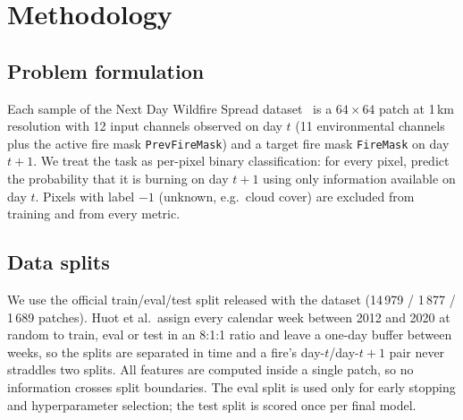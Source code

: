 
\section{Methodology}

\subsection{Problem formulation}
Each sample of the Next Day Wildfire Spread dataset~\cite{huot2022} is a $64\times64$ patch at
1\,km resolution with 12 input channels observed on day $t$ (11 environmental channels plus the
active fire mask \texttt{PrevFireMask}) and a target fire mask \texttt{FireMask} on day $t+1$.
We treat the task as per-pixel binary classification: for every pixel, predict the probability
that it is burning on day $t+1$ using only information available on day $t$.
Pixels with label $-1$ (unknown, e.g.\ cloud cover) are excluded from training and from every metric.

\subsection{Data splits}
We use the official train/eval/test split released with the dataset
(14\,979 / 1\,877 / 1\,689 patches). Huot et al.\ assign every calendar week between 2012 and 2020
at random to train, eval or test in an 8:1:1 ratio and leave a one-day buffer between weeks, so
the splits are separated in time and a fire's day-$t$/day-$t{+}1$ pair never straddles two splits.
All features are computed inside a single patch, so no information crosses split boundaries.
The eval split is used only for early stopping and hyperparameter selection;
the test split is scored once per final model.

